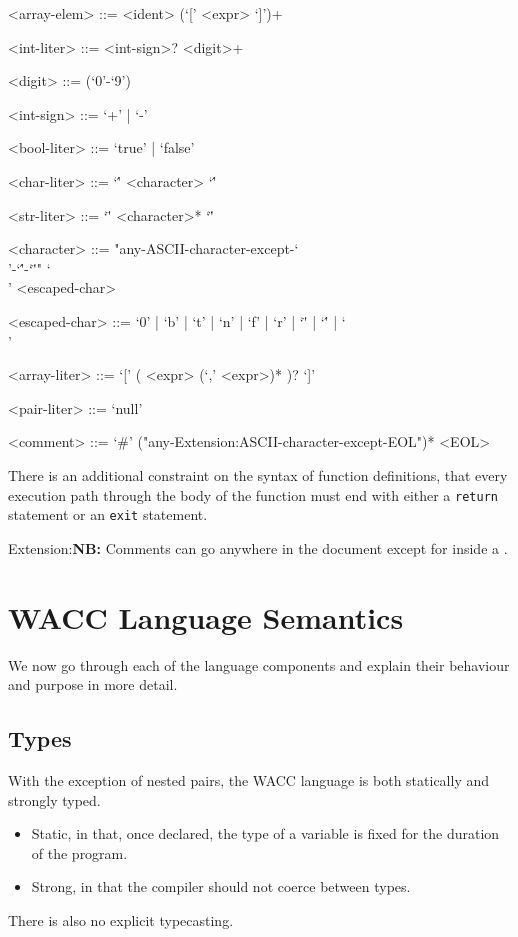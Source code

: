 \documentclass[a4paper]{article}
\theoremstyle{definition}
\begin{document}
\begin{grammar}
  <array-elem> ::= <ident> (`[' <expr> `]')+

  <int-liter> ::= <int-sign>? <digit>+

  <digit> ::= (`0'-`9')

  <int-sign> ::= `+' | `-'

  <bool-liter> ::= `true' | `false'

  <char-liter> ::= `\'' <character> `\''

  <str-liter> ::= `\"' <character>* `\"'

  <character> ::= "any-ASCII-character-except-`\\'-`\''-`\"'"
    \alt `\\' <escaped-char>

  <escaped-char> ::= `0' | `b' | `t' | `n' | `f' | `r' | `\"' | `\'' | `\\'

  <array-liter> ::= `[' ( <expr> (`,' <expr>)* )? `]'

  <pair-liter> ::= `null'

  <comment> ::= `#' ("any-Extension:{ASCII-}character-except-EOL")* <EOL>
\end{grammar}

 There is an additional constraint on the syntax of function definitions,
that every execution path through the body of the function must end with either a \texttt{return} statement or an \texttt{exit} statement.

\noindent Extension:{\bf NB:} Comments can go anywhere in the document except for inside a .


\section{WACC Language Semantics}
We now go through each of the language components and explain their behaviour and purpose in more detail.

\subsection{Types}
With the exception of nested pairs, the WACC language is both statically and strongly typed.
\begin{itemize}
  \item Static, in that, once declared, the type of a variable is fixed for the duration of the program.
  \item Strong, in that the compiler should not coerce between types.
\end{itemize}
There is also no explicit typecasting.
\end{document}
